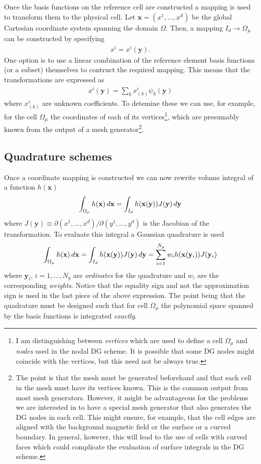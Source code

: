 \documentclass[11pt, reqno]{amsart}
\newcommand{\mvec}[1]{\mathbf{#1}}
\theoremstyle{definition}
\begin{document}
Once the basis functions on the reference cell are constructed a
mapping is used to transform them to the physical cell. Let $\mvec{x}
= (x^1,\ldots,x^d)$ be the global Cartesian coordinate system spanning
the domain $\Omega$. Then, a mapping $I_d\rightarrow \Omega_\mu$ can
be constructed by specifying
\begin{align}
  x^i = x^i(\mvec{y}).
\end{align}
One option is to use a linear combination of the reference element
basis functions (or a subset) themselves to contruct the required
mapping. This means that the transformations are expressed as
\begin{align}
  x^i(\mvec{y}) = \sum_k x^i_{(k)} \psi_k(\mvec{y})
\end{align}
where $x^i_{(k)}$ are unknown coefficients. To detemine these we can
use, for example, for the cell $\Omega_\mu$ the coordinates of each of
its vertices\footnote{I am distinguishing between \emph{vertices}
  which are used to define a cell $\Omega_\mu$ and \emph{nodes} used
  in the nodal DG scheme. It is possible that some DG nodes might
  coincide with the vertices, but this need not be always true.},
which are presumably known from the output of a mesh
generator\footnote{The point is that the mesh must be generated
  beforehand and that each cell in the mesh must have its vertices
  known. This is the common output from most mesh generators. However,
  it might be advantageous for the problems we are interested in to
  have a special mesh generator that also generates the DG nodes in
  each cell. This might ensure, for example, that the cell edges are
  aligned with the background magnetic field or the surface or a
  curved boundary. In general, however, this will lead to the use of
  cells with curved faces which could complicate the evaluation of
  surface integrals in the DG scheme.}.

\subsection{Quadrature schemes}

Once a coordinate mapping is constructed we can now rewrite volume
integral of a function $h(\mvec{x})$ 
\begin{align}
  \int_{\Omega_\mu}h(\mvec{x})\thinspace d\mvec{x} 
  =
  \int_{I_d}
  h(\mvec{x}(\mvec{y})) J(\mvec{y}) \thinspace d\mvec{y}
\end{align}
where $J(\mvec{y}) \equiv \partial (x^1,\ldots,x^d)/\partial
(y^1,\ldots,y^d)$ is the Jacobian of the transformation. To evaluate
this integral a Gaussian quadrature is used
\begin{align}
  \int_{\Omega_\mu}
  h(\mvec{x})\thinspace d\mvec{x} 
  =
  \int_{I_d}
  h(\mvec{x}(\mvec{y})) J(\mvec{y}) \thinspace d\mvec{y}
  =
  \sum_{i=1}^{N_g} w_ih(\mvec{x}(\mvec{y}_i)) J(\mvec{y}_i)
\end{align}
where $\mvec{y}_i$, $i=1,\ldots,N_g$ are \emph{ordinates} for the
quadrature and $w_i$ are the corresponding \emph{weights}. Notice that
the equality sign and not the approximation sign is used in the last
piece of the above expression. The point being that the quadrature
must be designed such that for cell $\Omega_\mu$ the polynomial space
spanned by the basis functions is integrated \emph{exactly}.
\end{document}
